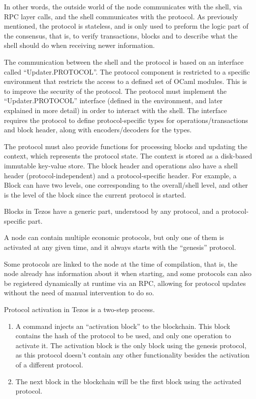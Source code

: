 In other words, the outside world of the node communicates with the shell, via RPC layer calls, and the shell communicates with the protocol. As previously mentioned, the protocol is stateless, and is only used to preform the logic part of the consensus, that is, to verify transactions, blocks and to describe what the shell should do when receiving newer information.

The communication between the shell and the protocol is based on an interface called ``Updater.PROTOCOL''.
The protocol component is restricted to a specific environment that restricts the access to a defined set of OCaml modules. This is to improve the security of the protocol.
The protocol must implement the ``Updater.PROTOCOL'' interface (defined in the environment, and later explained in more detail) in order to interact with the shell. The interface requires the protocol to define protocol-specific types for operations/transactions and block header, along with encoders/decoders for the types.

The protocol must also provide functions for processing blocks and updating the context, which represents the protocol state. The context is stored as a disk-based immutable key-value store. The block header and operations also have a shell header (protocol-independent) and a protocol-specific header.
For example, a Block can have two levels, one corresponding to the overall/shell level, and other is the level of the block since the current protocol is started.

Blocks in Tezos have a generic part, understood by any protocol, and a protocol-specific part.

A node can contain multiple economic protocols, but only one of them is activated at any given time, and it always starts with the ``genesis'' protocol.

Some protocols are linked to the node at the time of compilation, that is, the node already has information about it when starting, and some protocols can also be registered dynamically at runtime via an RPC, allowing for protocol updates without the need of manual intervention to do so.

Protocol activation in Tezos is a two-step process. 
\begin{enumerate}
    \item A command injects an ``activation block'' to the blockchain. This block contains the hash of the protocol to be used, and only one operation to activate it. The activation block is the only block using the genesis protocol, as this protocol doesn't contain any other functionality besides the activation of a different protocol.

\item The next block in the blockchain will be the first block using the activated protocol. 
\end{enumerate}


